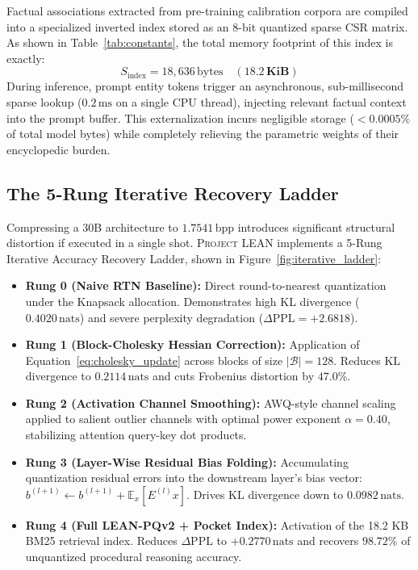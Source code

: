 \documentclass[10pt,twocolumn,letterpaper]{article}
\newcommand{\systemname}{\textsc{Project LEAN}}
\newcommand{\E}{\mathbb{E}}
\begin{document}
Factual associations extracted from pre-training calibration corpora are compiled into a specialized inverted index stored as an 8-bit quantized sparse CSR matrix. As shown in Table~\ref{tab:constants}, the total memory footprint of this index is exactly:
\begin{equation}
    S_{\text{index}} = 18,636\,\text{bytes} \quad (\mathbf{18.2\,\text{KiB}})
\end{equation}
During inference, prompt entity tokens trigger an asynchronous, sub-millisecond sparse lookup ($0.2\,\text{ms}$ on a single CPU thread), injecting relevant factual context into the prompt buffer. This externalization incurs negligible storage ($<0.0005\%$ of total model bytes) while completely relieving the parametric weights of their encyclopedic burden.

\subsection{The 5-Rung Iterative Recovery Ladder}
\label{sec:system_ladder}
Compressing a 30B architecture to $1.7541\,\text{bpp}$ introduces significant structural distortion if executed in a single shot. \systemname{} implements a 5-Rung Iterative Accuracy Recovery Ladder, shown in Figure~\ref{fig:iterative_ladder}:

\begin{itemize}[leftmargin=*]
    \item \textbf{Rung 0 (Naive RTN Baseline):} Direct round-to-nearest quantization under the Knapsack allocation. Demonstrates high KL divergence ($0.4020\,\text{nats}$) and severe perplexity degradation ($\Delta\text{PPL} = +2.6818$).
    \item \textbf{Rung 1 (Block-Cholesky Hessian Correction):} Application of Equation~\eqref{eq:cholesky_update} across blocks of size $|\mathcal{B}| = 128$. Reduces KL divergence to $0.2114\,\text{nats}$ and cuts Frobenius distortion by $47.0\%$.
    \item \textbf{Rung 2 (Activation Channel Smoothing):} AWQ-style channel scaling~\cite{lin2023awq} applied to salient outlier channels with optimal power exponent $\alpha = 0.40$, stabilizing attention query-key dot products.
    \item \textbf{Rung 3 (Layer-Wise Residual Bias Folding):} Accumulating quantization residual errors into the downstream layer's bias vector: $b^{(l+1)} \gets b^{(l+1)} + \E_{x}[E^{(l)} x]$. Drives KL divergence down to $0.0982\,\text{nats}$.
    \item \textbf{Rung 4 (Full LEAN-PQv2 + Pocket Index):} Activation of the 18.2 KB BM25 retrieval index. Reduces $\Delta\text{PPL}$ to $+0.2770\,\text{nats}$ and recovers $98.72\%$ of unquantized procedural reasoning accuracy.
\end{itemize}
\end{document}
